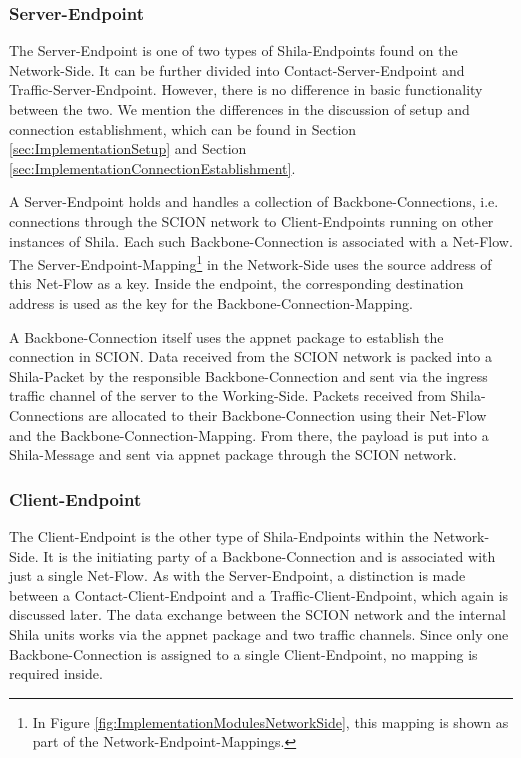 \subsubsection{Server-Endpoint}

The Server-Endpoint is one of two types of Shila-Endpoints found on the Network-Side. It can be further divided into Contact-Server-Endpoint and Traffic-Server-Endpoint. However, there is no difference in basic functionality between the two. We mention the differences in the discussion of setup and connection establishment, which can be found in Section \ref{sec:ImplementationSetup} and Section \ref{sec:ImplementationConnectionEstablishment}.

A Server-Endpoint holds and handles a collection of Backbone-Connections, i.e. connections through the SCION network to Client-Endpoints running on other instances of Shila. Each such Backbone-Connection is associated with a Net-Flow. The Server-Endpoint-Mapping\footnote{In Figure \ref{fig:ImplementationModulesNetworkSide}, this mapping is shown as part of the Network-Endpoint-Mappings.} in the Network-Side uses the source address of this Net-Flow as a key. Inside the endpoint, the corresponding destination address is used as the key for the Backbone-Connection-Mapping. %

A Backbone-Connection itself uses the appnet package \cite{Appnet} to establish the connection in SCION. Data received from the SCION network is packed into a Shila-Packet by the responsible Backbone-Connection and sent via the ingress traffic channel of the server to the Working-Side. Packets received from Shila-Connections are allocated to their Backbone-Connection using their Net-Flow and the Backbone-Connection-Mapping. From there, the payload is put into a Shila-Message and sent via appnet package through the SCION network.

\subsubsection{Client-Endpoint}

The Client-Endpoint is the other type of Shila-Endpoints within the Network-Side. It is the initiating party of a Backbone-Connection and is associated with just a single Net-Flow. As with the Server-Endpoint, a distinction is made between a Contact-Client-Endpoint and a Traffic-Client-Endpoint, which again is discussed later. The data exchange between the SCION network and the internal Shila units works via the appnet package and two traffic channels. Since only one Backbone-Connection is assigned to a single Client-Endpoint, no mapping is required inside.

